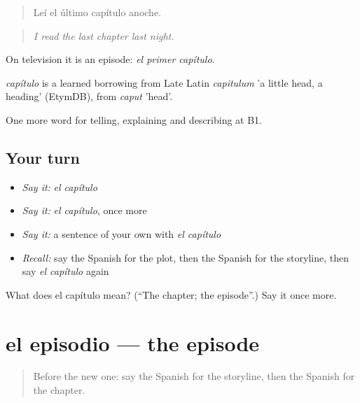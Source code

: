 \begin{quote}
Leí el último capítulo anoche.
\end{quote}

\begin{quote}
\emph{I read the last chapter last night.}
\end{quote}

On television it is an episode: \emph{el primer capítulo}.

\begin{cousinweb}
\emph{capítulo} is a learned borrowing from Late Latin \emph{capitulum} 'a little head, a heading' (EtymDB), from \emph{caput} 'head'.
\end{cousinweb}

\begin{grammarlens}[title={What you've built}]
One more word for telling, explaining and describing at B1.
\end{grammarlens}

\subsection*{Your turn}
\begin{itemize}
\raggedright
  \item \emph{Say it:} \emph{el capítulo}
  \item \emph{Say it:} \emph{el capítulo}, once more
  \item \emph{Say it:} a sentence of your own with \emph{el capítulo}
  \item \emph{Recall:} say the Spanish for the plot, then the Spanish for the storyline, then say \emph{el capítulo} again
\end{itemize}

\begin{tcolorbox}[breakable,colback=teal!4,colframe=teal!35!black,title={Before you move on}]
What does el capítulo mean? (\textquotedblleft{}The chapter; the episode\textquotedblright{}.) Say it once more.
\end{tcolorbox}
\section[el episodio]{el episodio — the episode}

\label{lesson:ES-C565-episodio}



\begin{quote}
Before the new one: say the Spanish for the storyline, then the Spanish for the chapter.
\end{quote}

